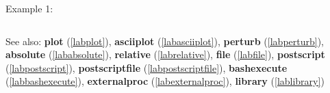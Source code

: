 \noindent Example 1: 
\begin{center}\begin{minipage}{15cm}\begin{Verbatim}[frame=single]
\end{Verbatim}
\end{minipage}\end{center}
See also: \textbf{plot} (\ref{labplot}), \textbf{asciiplot} (\ref{labasciiplot}), \textbf{perturb} (\ref{labperturb}), \textbf{absolute} (\ref{lababsolute}), \textbf{relative} (\ref{labrelative}), \textbf{file} (\ref{labfile}), \textbf{postscript} (\ref{labpostscript}), \textbf{postscriptfile} (\ref{labpostscriptfile}), \textbf{bashexecute} (\ref{labbashexecute}), \textbf{externalproc} (\ref{labexternalproc}), \textbf{library} (\ref{lablibrary})
